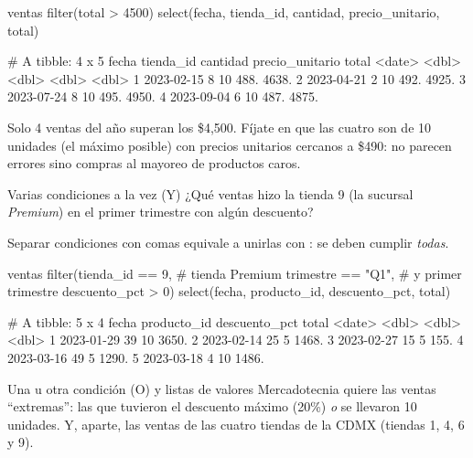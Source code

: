 \begin{rcode}
ventas %
  filter(total > 4500) %
  select(fecha, tienda_id, cantidad, precio_unitario, total)
\end{rcode}
\begin{rsalida}
# A tibble: 4 x 5
  fecha      tienda_id cantidad precio_unitario total
  <date>         <dbl>    <dbl>           <dbl> <dbl>
1 2023-02-15         8       10            488. 4638.
2 2023-04-21         2       10            492. 4925.
3 2023-07-24         8       10            495. 4950.
4 2023-09-04         6       10            487. 4875.
\end{rsalida}

Solo 4 ventas del año superan los \$4,500. Fíjate en que las cuatro son de
10 unidades (el máximo posible) con precios unitarios cercanos a \$490: no
parecen errores sino compras al mayoreo de productos caros.

\begin{ejemplo}{Varias condiciones a la vez (Y)}
¿Qué ventas hizo la tienda 9 (la sucursal \emph{Premium}) en el primer
trimestre con algún descuento?
\end{ejemplo}

Separar condiciones con comas equivale a unirlas con \codigo{\&}: se deben
cumplir \emph{todas}.

\begin{rcode}
ventas %
  filter(tienda_id == 9,            # tienda Premium
         trimestre == "Q1",         # y primer trimestre
         descuento_pct > 0) %
  select(fecha, producto_id, descuento_pct, total)
\end{rcode}
\begin{rsalida}
# A tibble: 5 x 4
  fecha      producto_id descuento_pct total
  <date>           <dbl>         <dbl> <dbl>
1 2023-01-29          39            10 3650.
2 2023-02-14          25             5 1468.
3 2023-02-27          15             5  155.
4 2023-03-16          49             5 1290.
5 2023-03-18           4            10 1486.
\end{rsalida}

\begin{ejemplo}{Una u otra condición (O) y listas de valores}
Mercadotecnia quiere las ventas ``extremas'': las que tuvieron el descuento
máximo (20\%) \emph{o} se llevaron 10 unidades. Y, aparte, las ventas de
las cuatro tiendas de la CDMX (tiendas 1, 4, 6 y 9).
\end{ejemplo}

